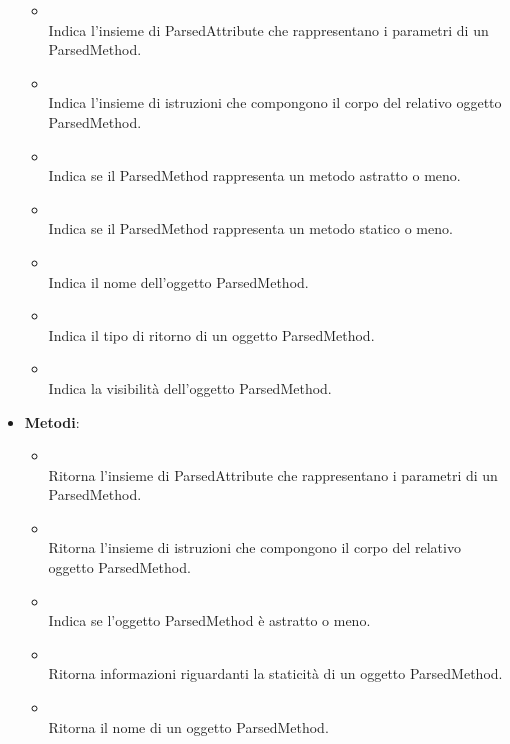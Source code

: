 \begin{itemize}
\begin{itemize}
\item {}
\\ Indica l'insieme di ParsedAttribute che rappresentano i parametri di un ParsedMethod.
\item {}
\\ Indica l'insieme di istruzioni che compongono il corpo del relativo oggetto ParsedMethod.
\item {}
\\ Indica se il ParsedMethod rappresenta un metodo astratto o meno.
\item {}
\\ Indica se il ParsedMethod rappresenta un metodo statico o meno.
\item {}
\\ Indica il nome dell'oggetto ParsedMethod.
\item {}
\\ Indica il tipo di ritorno di un oggetto ParsedMethod.
\item {}
\\ Indica la visibilità dell'oggetto ParsedMethod.
\end{itemize}
\item \textbf{Metodi}:
\begin{itemize}
\item {}
\\ Ritorna l'insieme di ParsedAttribute che rappresentano i parametri di un ParsedMethod.
\item {}
\\ Ritorna l'insieme di istruzioni che compongono il corpo del relativo oggetto ParsedMethod.
\item {}
\\ Indica se l'oggetto ParsedMethod è astratto o meno.
\item {}
\\ Ritorna informazioni riguardanti la staticità di un oggetto ParsedMethod.
\item {}
\\ Ritorna il nome di un oggetto ParsedMethod.

\end{itemize}
\end{itemize}
